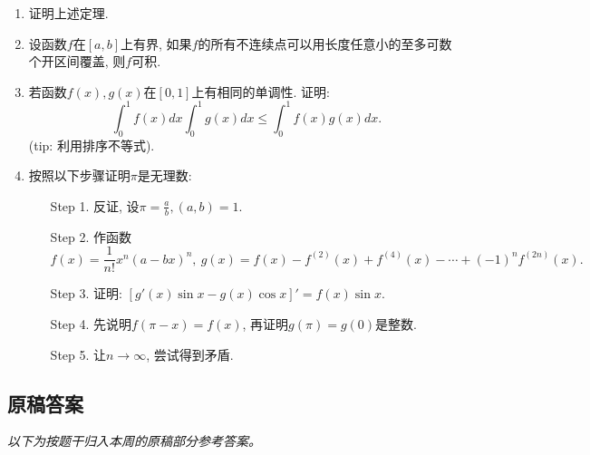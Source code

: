 \documentclass[UTF8,11pt, a4paper, oneside, fontset=none]{ctexbook}
\begin{document}
\begin{enumerate}

\item 证明上述定理.

\item 设函数$f$在$[a, b]$上有界, 如果$f$的所有不连续点可以用长度任意小的至多可数个开区间覆盖, 则$f$可积.

\item 若函数$f(x), g(x)$在$[0, 1]$上有相同的单调性. 证明:
\[
\int_0^1 f(x) dx \int_0^1 g(x) dx \leq \int_0^1 f(x) g(x) dx.
\]
(tip: 利用排序不等式).

\item 按照以下步骤证明$\pi$是无理数:

\begin{itemize}
\item[Step 1.] 反证, 设$\pi = \frac{a}{b}, (a, b)=1$.
\item[Step 2.] 作函数
\[
f(x) = \frac{1}{n!} x^n (a-bx)^n, \ g(x) = f(x) - f^{(2)}(x) + f^{(4)}(x) - \cdots + (-1)^n f^{(2n)}(x).
\]
\item[Step 3.] 证明: $[g'(x) \sin x - g(x) \cos x]' = f(x) \sin x$.
\item[Step 4.] 先说明$f(\pi-x) = f(x)$, 再证明$g(\pi) = g(0)$是整数.
\item[Step 5.] 让$n \to \infty$, 尝试得到矛盾.
\end{itemize}

\end{enumerate}

\clearpage

\subsection*{原稿答案}

\noindent\emph{以下为按题干归入本周的原稿部分参考答案。}
\end{document}
